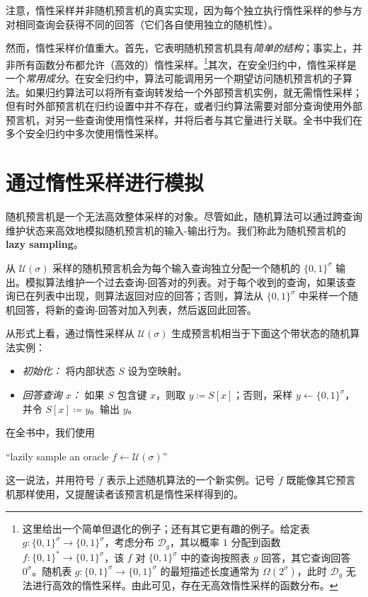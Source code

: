 \documentclass[american,singlepageview]{snargs-book-zh}
\newcommand{\DoQuote}[1]{``#1''}
\newcommand{\Bits}{\{0,1\}}
\newcommand{\DefineEqual}{\coloneqq}
\newcommand{\Distribution}{\mathcal{D}}
\newcommand{\ROFunction}{f}
\newcommand{\RODistribution}[1]{\mathcal{U}(#1)}
\newcommand{\ROQuery}{x}
\newcommand{\ROAnswer}{y}
\newcommand{\ROOutputSize}{\sigma}
\newcommand{\Lazy}[1]{\dot{#1}}
\begin{document}
注意，惰性采样并非随机预言机的真实实现，因为每个独立执行惰性采样的参与方对相同查询会获得不同的回答（它们各自使用独立的随机性）。

然而，惰性采样价值重大。首先，它表明随机预言机具有\emph{简单的结构}；事实上，并非所有函数分布都允许（高效的）惰性采样。\footnote{这里给出一个简单但退化的例子；还有其它更有趣的例子。给定表 $g \colon \Bits^{\ROOutputSize} \to \Bits^{\ROOutputSize}$，考虑分布 $\Distribution_{g}$，其以概率 $1$ 分配到函数 $\ROFunction \colon \Bits^{*} \to \Bits^{\ROOutputSize}$，该 $\ROFunction$ 对 $\Bits^{\ROOutputSize}$ 中的查询按照表 $g$ 回答，其它查询回答 $0^{\ROOutputSize}$。随机表 $g \colon \Bits^{\ROOutputSize} \to \Bits^{\ROOutputSize}$ 的最短描述长度通常为 $\Omega(2^{\ROOutputSize})$，此时 $\Distribution_{g}$ 无法进行高效的惰性采样。由此可见，存在无高效惰性采样的函数分布。}其次，在安全归约中，惰性采样是一个\emph{常用成分}。在安全归约中，算法可能调用另一个期望访问随机预言机的子算法。如果归约算法可以将所有查询转发给一个外部预言机实例，就无需惰性采样；但有时外部预言机在归约设置中并不存在，或者归约算法需要对部分查询使用外部预言机，对另一些查询使用惰性采样，并将后者与其它量进行关联。全书中我们在多个安全归约中多次使用惰性采样。

\section{通过惰性采样进行模拟}
\label{section:rom-lazy-sampling}

随机预言机是一个无法高效整体采样的对象。尽管如此，随机算法可以通过跨查询维护状态来高效地模拟随机预言机的输入-输出行为。我们称此为随机预言机的\textbf{lazy sampling}。

从 $\RODistribution{\ROOutputSize}$ 采样的随机预言机会为每个输入查询独立分配一个随机的 $\Bits^{\ROOutputSize}$ 输出。模拟算法维护一个过去查询-回答对的列表。对于每个收到的查询，如果该查询已在列表中出现，则算法返回对应的回答；否则，算法从 $\Bits^{\ROOutputSize}$ 中采样一个随机回答，将新的查询-回答对加入列表，然后返回此回答。

从形式上看，通过惰性采样从 $\RODistribution{\ROOutputSize}$ 生成预言机相当于下面这个带状态的随机算法实例：
\begin{itemize}[noitemsep]
  \item \emph{初始化：} 将内部状态 $S$ 设为空映射。
  \item \emph{回答查询 $\ROQuery$：} 如果 $S$ 包含键 $\ROQuery$，则取 $\ROAnswer \DefineEqual S[\ROQuery]$；否则，采样 $\ROAnswer \gets \Bits^{\ROOutputSize}$，并令 $S[\ROQuery] \DefineEqual \ROAnswer$。输出 $\ROAnswer$。
\end{itemize}
在全书中，我们使用
\begin{center}
\DoQuote{lazily sample an oracle $\Lazy{\ROFunction} \gets \RODistribution{\ROOutputSize}$}
\end{center}
这一说法，并用符号 $\Lazy{\ROFunction}$ 表示上述随机算法的一个新实例。记号 $\Lazy{\ROFunction}$ 既能像其它预言机那样使用，又提醒读者该预言机是惰性采样得到的。
\end{document}
